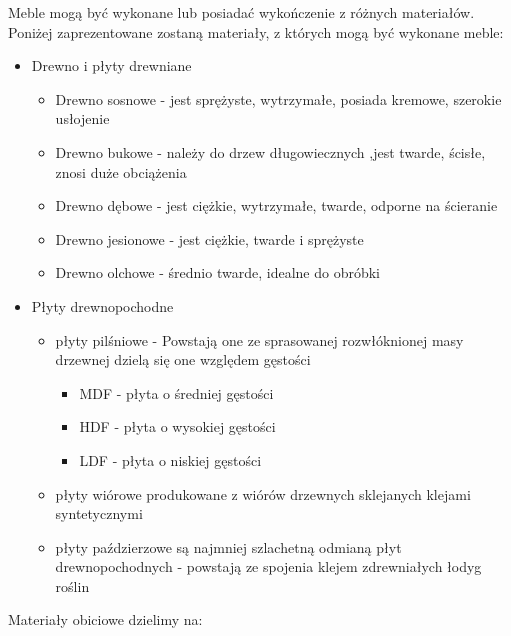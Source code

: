 		\par Meble mogą być wykonane lub posiadać wykończenie z różnych materiałów. Poniżej zaprezentowane zostaną materiały, z których mogą być wykonane meble:
		
		\begin{itemize}
			\item{Drewno i płyty drewniane}
				\begin{itemize}
					\item{Drewno sosnowe} - jest sprężyste, wytrzymałe, posiada kremowe, szerokie usłojenie
					\item{Drewno bukowe} - należy do drzew długowiecznych ,jest twarde, ścisłe, znosi duże obciążenia
					\item{Drewno dębowe} - jest ciężkie, wytrzymałe, twarde, odporne na ścieranie
					\item{Drewno jesionowe} - jest ciężkie, twarde i sprężyste
					\item{Drewno olchowe} - średnio twarde, idealne do obróbki
				\end{itemize}
			\item{Płyty drewnopochodne}
				\begin{itemize}
					\item{płyty pilśniowe} - Powstają one ze sprasowanej rozwłóknionej masy drzewnej dzielą się one względem gęstości
						\begin{itemize}
							\item{MDF} - płyta o średniej gęstości
							\item{HDF} - płyta o wysokiej gęstości
							\item{LDF} - płyta o niskiej gęstości
						\end{itemize}
					\item{płyty wiórowe} produkowane z wiórów drzewnych sklejanych klejami syntetycznymi
					\item{płyty paździerzowe} są najmniej szlachetną odmianą płyt drewnopochodnych - powstają ze spojenia klejem zdrewniałych łodyg roślin
				\end{itemize}
		\end{itemize}
		
		\par Materiały obiciowe dzielimy na:
		
